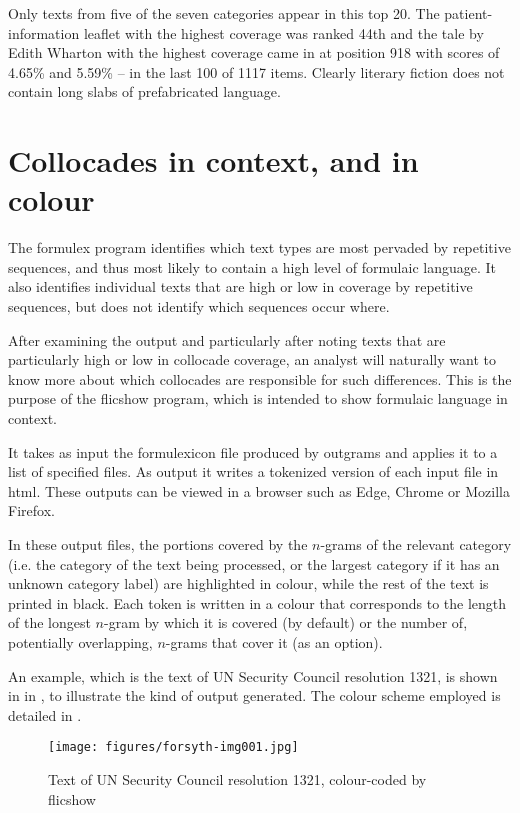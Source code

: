 \documentclass[output=paper]{langscibook}
\begin{document}
Only texts from five of the seven categories appear in this top 20. The patient-information leaflet with the highest coverage was ranked 44th and the tale by Edith Wharton with the highest coverage came in at position 918 with scores of 4.65\% and 5.59\% -- in the last 100 of 1117 items. Clearly literary fiction does not contain long slabs of prefabricated language.

\section{Collocades in context, and in colour}\label{sec:forsyth:5}

The formulex program identifies which text types are most pervaded by repetitive sequences, and thus most likely to contain a high level of formulaic language. It also identifies individual texts that are high or low in coverage by repetitive sequences, but does not identify which sequences occur where.

After examining the output and particularly after noting texts that are particularly high or low in collocade coverage, an analyst will naturally want to know more about which collocades are responsible for such differences. This is the purpose of the flicshow program, which is intended to show formulaic language in context.

It takes as input the formulexicon file produced by outgrams and applies it to a list of specified files. As output it writes a tokenized version of each input file in html. These outputs can be viewed in a browser such as Edge, Chrome or Mozilla Firefox.

In these output files, the portions covered by the $n$-grams of the relevant category (i.e. the category of the text being processed, or the largest category if it has an unknown category label) are highlighted in colour, while the rest of the text is printed in black. Each token is written in a colour that corresponds to the length of the longest $n$-gram by which it is covered (by default) or the number of, potentially overlapping, $n$-grams that cover it (as an option).


An example, which is the text of UN Security Council resolution 1321, is shown in in , to illustrate the kind of output generated. The colour scheme employed is detailed in .

\begin{figure}
\texttt{[image: figures/forsyth-img001.jpg]}
\caption{Text of UN Security Council resolution 1321, colour-coded by flicshow}
\label{fig:forsyth:1}
\end{figure}
\end{document}
